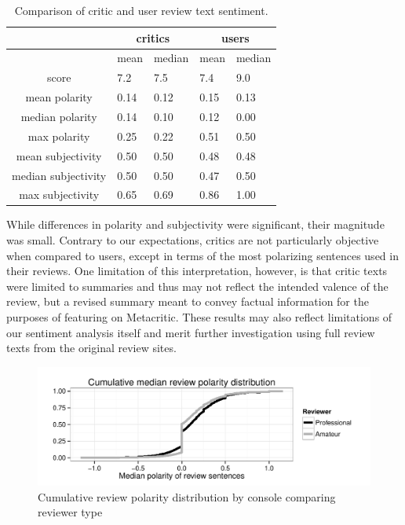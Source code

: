 \documentclass[letterpaper]{article}
\begin{document}
\begin{table}
\scriptsize
\begin{tabularx}{\linewidth}{|c|X|X|X|X|}
\hline  & \multicolumn{2}{|c|}{critics} & \multicolumn{2}{|c|}{users}  \\ 
\hline  & mean & median & mean & median \\ 
\hline score & 7.2 & 7.5 & 7.4 & 9.0 \\ 
\hline mean polarity & 0.14 & 0.12 & 0.15 & 0.13 \\ 
\hline median polarity & 0.14 & 0.10 & 0.12 & 0.00 \\ 
\hline max polarity & 0.25 & 0.22 & 0.51 & 0.50 \\ 
\hline mean subjectivity & 0.50 & 0.50 & 0.48 & 0.48 \\ 
\hline median subjectivity & 0.50 & 0.50 & 0.47 & 0.50 \\ 
\hline max subjectivity & 0.65 & 0.69 & 0.86 & 1.00 \\ 
\hline 
\end{tabularx}
\label{tab:review_pol_subj}
\caption{Comparison of critic and user review text sentiment.}
\end{table} 

While differences in polarity and subjectivity were significant, their magnitude was small. Contrary to our expectations, critics are not particularly objective when compared to users, except in terms of the most polarizing sentences used in their reviews. One limitation of this interpretation, however, is that critic texts were limited to summaries and thus may not reflect the intended valence of the review, but a revised summary meant to convey factual information for the purposes of featuring on Metacritic. These results may also reflect limitations of our sentiment analysis itself and merit further investigation using full review texts from the original review sites.


\begin{figure}[tb]
\centering
\includegraphics[width=\linewidth]{./console_reviews_polarity_ecdf}
\caption{Cumulative review polarity distribution by console comparing reviewer type}
\label{fig:revpol_density}
\end{figure}
\end{document}

